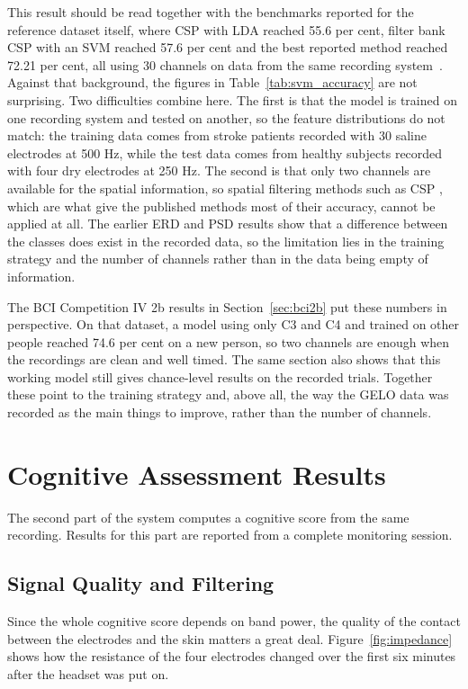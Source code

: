 This result should be read together with the benchmarks reported for the reference dataset
itself, where CSP with LDA reached 55.6 per cent, filter bank CSP with an SVM reached 57.6
per cent and the best reported method reached 72.21 per cent, all using 30 channels on data
from the same recording system~\cite{liu2024mi}. Against that background, the figures in
Table~\ref{tab:svm_accuracy} are not surprising. Two difficulties combine here. The first
is that the model is trained on one recording system and tested on another, so the feature
distributions do not match: the training data comes from stroke patients recorded with 30
saline electrodes at 500 Hz, while the test data comes from healthy subjects recorded with
four dry electrodes at 250 Hz. The second is that only two channels are available for the
spatial information, so spatial filtering methods such as CSP \cite{ramoser2000csp}, which are what give the
published methods most of their accuracy, cannot be applied at all. The earlier ERD and PSD
results show that a difference between the classes does exist in the recorded data, so the
limitation lies in the training strategy and the number of channels rather than in the data
being empty of information.

The BCI Competition IV 2b results in Section~\ref{sec:bci2b} put these numbers in
perspective. On that dataset, a model using only C3 and C4 and trained on other people
reached 74.6 per cent on a new person, so two channels are enough when the recordings are
clean and well timed. The same section also shows that this working model still gives
chance-level results on the recorded trials. Together these point to the training
strategy and, above all, the way the GELO data was recorded as the main things to
improve, rather than the number of channels.

\FloatBarrier

\section{Cognitive Assessment Results}

The second part of the system computes a cognitive score from the same recording. Results
for this part are reported from a complete monitoring session.

\subsection{Signal Quality and Filtering}

Since the whole cognitive score depends on band power, the quality of the contact between
the electrodes and the skin matters a great deal. Figure~\ref{fig:impedance} shows how the
resistance of the four electrodes changed over the first six minutes after the headset was
put on.

